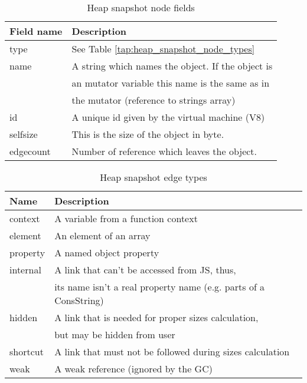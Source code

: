 \begin{table}[!htbp]
	\small
	\centering
	\begin{tabular}{|p{1.5cm}||p{5.5cm}|}
		\hline
		\textbf{Field name}	& \textbf{Description} 				\\ \hline \hline
		type & See Table \ref{tap:heap_snapshot_node_types}			\\ \hline
		name & A string which names the object. If the object is	\\
			 & an mutator variable this name is the same as in 		\\
			 & the mutator (reference to strings array)				\\ \hline	
		id	 & A unique id given by the virtual machine (V8)		\\ \hline
		selfsize  & This is the size of the object in byte. 		\\ \hline
		edgecount &	Number of reference which leaves the object.	\\ \hline	
	\end{tabular}
	\caption{Heap snapshot node fields}
	\label{tap:heap_snapshot_node_fields}
\end{table}

\begin{table}[!h]
	\small
	\centering
	\begin{tabular}{|p{1.5cm}||p{5.5cm}|}
		\hline
		\textbf{Name} & \textbf{Description} 					\\ \hline \hline
		context  & A variable from a function context			\\ \hline
		element  & An element of an array 						\\ \hline
		property & A named object property						\\ \hline
		internal &	A link that can't be accessed from JS, thus,\\
				 & its name isn't a real property name 
				  	(e.g. parts of a ConsString)				\\ \hline
		hidden	  & A link that is needed for proper sizes 
		 			calculation, 								\\
				  & but may be hidden from user					\\ \hline
		shortcut  & A link that must not be followed during	
					sizes calculation							\\ \hline
		weak 	  &	A weak reference (ignored by the GC)		\\ \hline
	\end{tabular}
	\caption{Heap snapshot edge types}
	\label{tap:heap_snapshot_edge_types}
\end{table}
		
